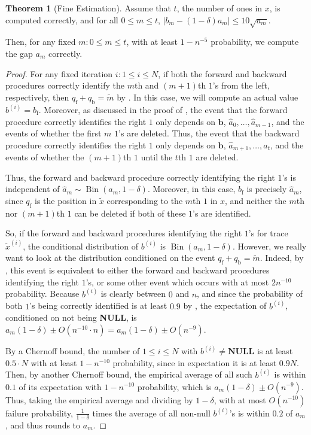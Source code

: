 \documentclass[12pt]{article}
\theoremstyle{definition}
\newtheorem{theorem}{Theorem}[section]
\theoremstyle{remark}
\DeclareMathOperator{\Bin}{Bin}
\newcommand{\bb}{\mathbf b}
\begin{document}
\begin{theorem}[Fine Estimation] \label{thm:fine}
    Assume that $t$, the number of ones in $x$, is computed correctly, and for all $0 \le m \le t$, $|b_m-(1-\delta) a_m| \le 10 \sqrt{a_m}$.

    Then, for any fixed $m: 0 \le m \le t$, with at least $1 - n^{-5}$ probability, we compute the gap $a_m$ correctly.
\end{theorem}

\begin{proof}
    For any fixed iteration $i: 1 \le i \le N$, if both the forward and backward procedures correctly identify the $m$th and $(m+1)$th $1$'s from the left, respectively, then $q_{\text{f}}+q_{\text{b}} = \tilde{m}$ by . In this case, we will compute an actual value $b^{(i)} = b_{\text{f}}$. Moreover, as discussed in the proof of , the event that the forward procedure correctly identifies the right $1$ only depends on $\bb$, $\hat{a}_0, \dots, \hat{a}_{m-1}$, and the events of whether the first $m$ $1$'s are deleted. Thus, the event that the backward procedure correctly identifies the right $1$ only depends on $\bb$, $\hat{a}_{m+1}, \dots, \hat{a}_t$, and the events of whether the $(m+1)$th $1$ until the $t$th $1$ are deleted.

    Thus, the forward and backward procedure correctly identifying the right $1$'s is independent of $\hat{a}_m \sim \Bin(a_m, 1-\delta)$. Moreover, in this case, $b_{\text{f}}$ is precisely $\hat{a}_m$, since $q_{\text{f}}$ is the position in $\tilde{x}$ corresponding to the $m$th $1$ in $x$, and neither the $m$th nor $(m+1)$th $1$ can be deleted if both of these $1$'s are identified.

    So, if the forward and backward procedures identifying the right $1$'s for trace $\tilde{x}^{(i)}$, the conditional distribution of $b^{(i)}$ is $\Bin(a_m, 1-\delta)$. However, we really want to look at the distribution conditioned on the event $q_{\text{f}}+q_{\text{b}} = \tilde{m}$. Indeed, by , this event is equivalent to either the forward and backward procedures identifying the right $1$'s, or some other event which occurs with at most $2n^{-10}$ probability. Because $b^{(i)}$ is clearly between $0$ and $n$, and since the probability of both $1$'s being correctly identified is at least $0.9$ by , the expectation of $b^{(i)}$, conditioned on not being \textbf{NULL}, is $a_m(1-\delta) \pm O(n^{-10} \cdot n) = a_m(1-\delta) \pm O(n^{-9})$.

    By a Chernoff bound, the number of $1 \le i \le N$ with $b^{(i)} \neq \textbf{NULL}$ is at least $0.5 \cdot N$ with at least $1 - n^{-10}$ probability, since in expectation it is at least $0.9 N$. Then, by another Chernoff bound, the empirical average of all such $b^{(i)}$ is within $0.1$ of its expectation with $1 - n^{-10}$ probability, which is $a_m(1-\delta) \pm O(n^{-9})$. Thus, taking the empirical average and dividing by $1-\delta$, with at most $O(n^{-10})$ failure probability, $\frac{1}{1-\delta}$ times the average of all non-null $b^{(i)}$'s is within $0.2$ of $a_m$, and thus rounds to $a_m$.
\end{proof}





\end{document}
